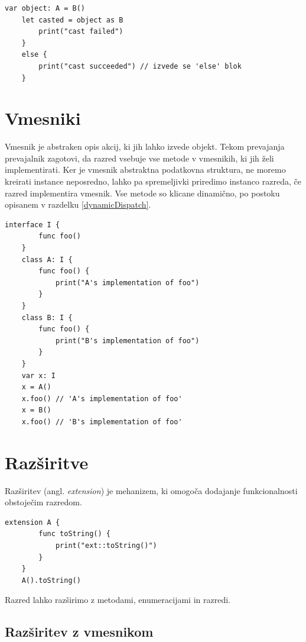 \documentclass[a4paper, 12pt]{book}
\begin{document}
\begin{lstlisting}[caption={Pretvorba za razrede iz sheme ~\ref{vtables}}, captionpos=b]
	var object: A = B()
	let casted = object as B
	    print("cast failed")
	}
	else {
	    print("cast succeeded") // izvede se 'else' blok
	}
\end{lstlisting}

\newpage

\section{Vmesniki}

Vmesnik je abstraken opis akcij, ki jih lahko izvede objekt. Tekom prevajanja prevajalnik zagotovi, da razred vsebuje vse metode v vmesnikih, ki jih želi implementirati. Ker je vmesnik abstraktna podatkovna struktura, ne moremo kreirati instance neposredno, lahko pa spremeljivki priredimo instanco razreda, če razred implementira vmesnik. Vse metode so klicane dinamično, po postoku opisanem v razdelku \ref{dynamicDispatch}.

\begin{lstlisting}[caption={Vmesniki}, label={lst:interfaces}, captionpos=b]
	interface I {
	    func foo()
	}
	class A: I {
	    func foo() {
	        print("A's implementation of foo")
	    }
	}
	class B: I {
	    func foo() {
	        print("B's implementation of foo")
	    }
	}
	var x: I
	x = A()
	x.foo() // 'A's implementation of foo'
	x = B()
	x.foo() // 'B's implementation of foo'
\end{lstlisting}

\section{Razširitve}

Razširitev (angl. \textit{extension}) je mehanizem, ki omogoča dodajanje funkcionalnosti obstoječim razredom. 

\begin{lstlisting}[caption={Razširitev razreda A}, captionpos=b]
	extension A {
	    func toString() {
	        print("ext::toString()")
	    }
	}
	A().toString()
\end{lstlisting}

Razred lahko razširimo z metodami, enumeracijami in razredi. 

\subsection{Razširitev z vmesnikom}
\end{document}
